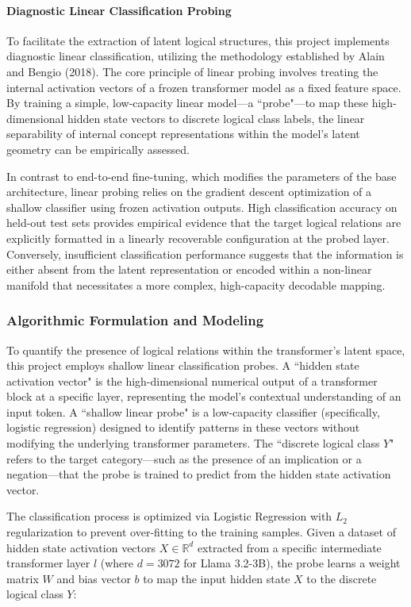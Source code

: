 \documentclass[12 pt]{article}  %
\newcommand{\Reals}[0]{\mathbb{R}}      %
\begin{document}
\paragraph{Diagnostic Linear Classification Probing}
To facilitate the extraction of latent logical structures, this project 
implements diagnostic linear classification, utilizing the methodology 
established by Alain and Bengio (2018). The core principle of linear probing 
involves treating the internal activation vectors of a frozen transformer model 
as a fixed feature space. By training a simple, low-capacity linear model—a 
``probe"—to map these high-dimensional hidden state vectors to discrete logical 
class labels, the linear separability of internal concept representations within 
the model's latent geometry can be empirically assessed.

In contrast to end-to-end fine-tuning, which modifies the parameters of the base 
architecture, linear probing relies on the gradient descent optimization of a 
shallow classifier using frozen activation outputs. High classification accuracy 
on held-out test sets provides empirical evidence that the target logical 
relations are explicitly formatted in a linearly recoverable configuration at 
the probed layer. Conversely, insufficient classification performance suggests 
that the information is either absent from the latent representation or encoded 
within a non-linear manifold that necessitates a more complex, high-capacity 
decodable mapping.

\subsubsection{Algorithmic Formulation and Modeling}
To quantify the presence of logical relations within the transformer's latent 
space, this project employs shallow linear classification probes. A ``hidden 
state activation vector" is the high-dimensional numerical output of a 
transformer block at a specific layer, representing the model's contextual 
understanding of an input token. A ``shallow linear probe" is a low-capacity 
classifier (specifically, logistic regression) designed to identify patterns in 
these vectors without modifying the underlying transformer parameters. The 
``discrete logical class $Y$" refers to the target category—such as the presence 
of an implication or a negation—that the probe is trained to predict from the 
hidden state activation vector.

The classification process is optimized via Logistic Regression with $L_2$ 
regularization to prevent over-fitting to the training samples. Given a dataset 
of hidden state activation vectors $X \in \Reals^{d}$ extracted from a specific 
intermediate transformer layer $l$ (where $d = 3072$ for Llama 3.2-3B), the 
probe learns a weight matrix $W$ and bias vector $b$ to map the input hidden 
state $X$ to the discrete logical class $Y$:
\end{document}
